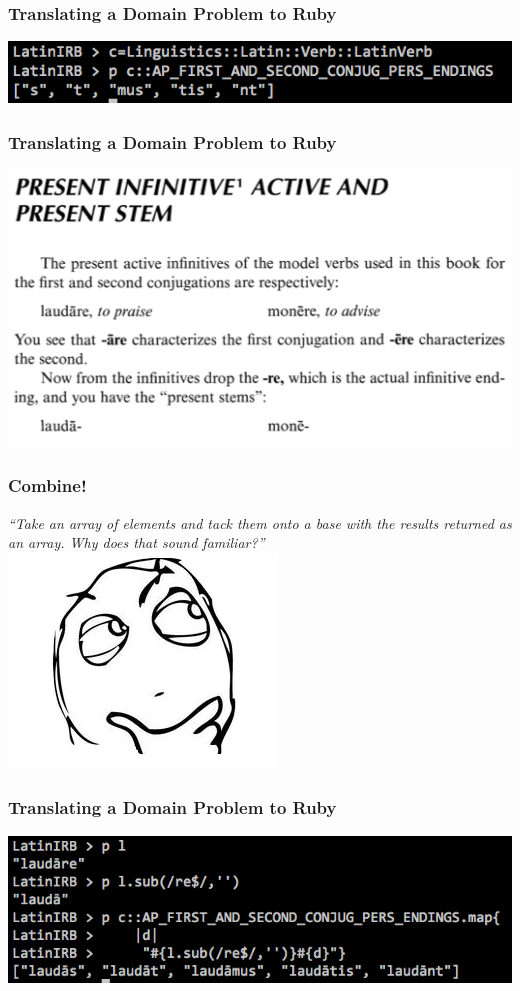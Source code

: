 \documentclass[slidestop,compress,mathserif]{beamer}
\begin{document}
\begin{frame}
	\frametitle{Translating a Domain Problem to Ruby} 
	\includegraphics[scale=0.45]{img/conj_how_1b.png}
\end{frame}

\begin{frame}
	\frametitle{Translating a Domain Problem to Ruby} 
	\includegraphics[scale=0.45]{img/conj_how_2.png}
\end{frame}

\begin{frame}
	\frametitle{Combine!}
	\emph{``Take an array of elements and tack them onto a base with the results
returned as an array. Why does that sound familiar?''}
	\includegraphics[scale=0.45]{img/determined.png}
\end{frame}

\begin{frame}
	\frametitle{Translating a Domain Problem to Ruby} 
	\vskip 1.0cm
	\begin{center}
		\includegraphics[scale=0.45]{img/conj_how_2b.png}	
	\end{center}
\end{frame}
\end{document}

